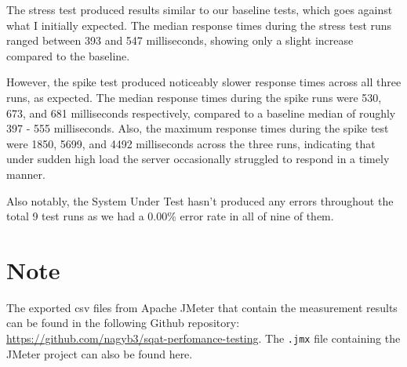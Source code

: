 \documentclass[11pt, leqno, oneside]{article}
\begin{document}
The stress test produced results similar to our baseline tests, which goes against what I initially expected. The median response times during the stress 
test runs ranged between 393 and 547 milliseconds, showing only a slight increase compared to the baseline. 

However, the spike test produced noticeably slower response times across all three runs, as expected. 
The median response times during the spike runs were 530, 673, and 681 milliseconds respectively, compared to a baseline median of roughly 397 - 555 milliseconds. 
Also, the maximum response times during the spike test were 1850, 5699, and 4492 milliseconds across the three runs, indicating that under sudden high load the server occasionally struggled to respond in a timely manner.  

Also notably, the System Under Test hasn't produced any errors throughout the total 9 test runs as we had a 0.00\% error rate in all of nine of them.

\section{Note}

The exported csv files from Apache JMeter that contain the measurement results can be found in the following Github repository: \url{https://github.com/nagyb3/sqat-perfomance-testing}.
The \texttt{.jmx} file containing the JMeter project can also be found here.
\end{document}
